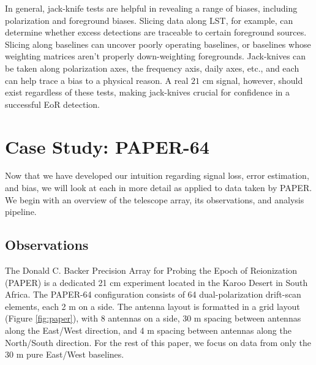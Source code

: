 \documentclass[preprint2,numberedappendix,tighten,twocolappendix]{aastex6}  %
\begin{document}
In general, jack-knife tests are helpful in revealing a range of biases, including polarization and foreground biases. Slicing data along LST, for example, can determine whether excess detections are traceable to certain foreground sources. Slicing along baselines can uncover poorly operating baselines, or baselines whose weighting matrices aren't properly down-weighting foregrounds. Jack-knives can be taken along polarization axes, the frequency axis, daily axes, etc., and each can help trace a bias to a physical reason. A real $21$ cm signal, however, should exist regardless of these tests, making jack-knives crucial for confidence in a successful EoR detection.

\section{Case Study: PAPER-64}
\label{sec:CaseStudy}

Now that we have developed our intuition regarding signal loss, error estimation, and bias, we will look at each in more detail as applied to data taken by PAPER. We begin with an overview of the telescope array, its observations, and analysis pipeline.

\subsection{Observations}
\label{sec:Obs}

The Donald C. Backer Precision Array for Probing the Epoch of Reionization (PAPER) is a dedicated 21 cm experiment located in the Karoo Desert in South Africa. The PAPER-64 configuration consists of 64 dual-polarization drift-scan elements, each 2 m on a side. The antenna layout is formatted in a grid layout (Figure \ref{fig:paper}), with 8 antennas on a side, 30 m spacing between antennas along the East/West direction, and 4 m spacing between antennas along the North/South direction. For the rest of this paper, we focus on data from only the 30 m pure East/West baselines. 
\end{document}
